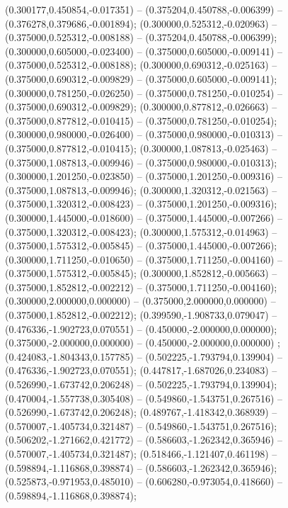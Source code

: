  (0.300177,0.450854,-0.017351) -- (0.375204,0.450788,-0.006399) -- (0.376278,0.379686,-0.001894);
 (0.300000,0.525312,-0.020963) -- (0.375000,0.525312,-0.008188) -- (0.375204,0.450788,-0.006399);
 (0.300000,0.605000,-0.023400) -- (0.375000,0.605000,-0.009141) -- (0.375000,0.525312,-0.008188);
 (0.300000,0.690312,-0.025163) -- (0.375000,0.690312,-0.009829) -- (0.375000,0.605000,-0.009141);
 (0.300000,0.781250,-0.026250) -- (0.375000,0.781250,-0.010254) -- (0.375000,0.690312,-0.009829);
 (0.300000,0.877812,-0.026663) -- (0.375000,0.877812,-0.010415) -- (0.375000,0.781250,-0.010254);
 (0.300000,0.980000,-0.026400) -- (0.375000,0.980000,-0.010313) -- (0.375000,0.877812,-0.010415);
 (0.300000,1.087813,-0.025463) -- (0.375000,1.087813,-0.009946) -- (0.375000,0.980000,-0.010313);
 (0.300000,1.201250,-0.023850) -- (0.375000,1.201250,-0.009316) -- (0.375000,1.087813,-0.009946);
 (0.300000,1.320312,-0.021563) -- (0.375000,1.320312,-0.008423) -- (0.375000,1.201250,-0.009316);
 (0.300000,1.445000,-0.018600) -- (0.375000,1.445000,-0.007266) -- (0.375000,1.320312,-0.008423);
 (0.300000,1.575312,-0.014963) -- (0.375000,1.575312,-0.005845) -- (0.375000,1.445000,-0.007266);
 (0.300000,1.711250,-0.010650) -- (0.375000,1.711250,-0.004160) -- (0.375000,1.575312,-0.005845);
 (0.300000,1.852812,-0.005663) -- (0.375000,1.852812,-0.002212) -- (0.375000,1.711250,-0.004160);
 (0.300000,2.000000,0.000000) -- (0.375000,2.000000,0.000000) -- (0.375000,1.852812,-0.002212);
 (0.399590,-1.908733,0.079047) -- (0.476336,-1.902723,0.070551) -- (0.450000,-2.000000,0.000000);
 (0.375000,-2.000000,0.000000) -- (0.450000,-2.000000,0.000000) ;
 (0.424083,-1.804343,0.157785) -- (0.502225,-1.793794,0.139904) -- (0.476336,-1.902723,0.070551);
 (0.447817,-1.687026,0.234083) -- (0.526990,-1.673742,0.206248) -- (0.502225,-1.793794,0.139904);
 (0.470004,-1.557738,0.305408) -- (0.549860,-1.543751,0.267516) -- (0.526990,-1.673742,0.206248);
 (0.489767,-1.418342,0.368939) -- (0.570007,-1.405734,0.321487) -- (0.549860,-1.543751,0.267516);
 (0.506202,-1.271662,0.421772) -- (0.586603,-1.262342,0.365946) -- (0.570007,-1.405734,0.321487);
 (0.518466,-1.121407,0.461198) -- (0.598894,-1.116868,0.398874) -- (0.586603,-1.262342,0.365946);
 (0.525873,-0.971953,0.485010) -- (0.606280,-0.973054,0.418660) -- (0.598894,-1.116868,0.398874);
